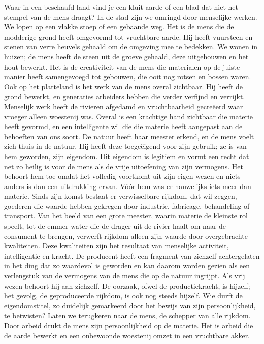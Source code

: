 \documentclass[
  a5paper,
  smalldemyvopaper,10pt,twoside,onecolumn,openright,extrafontsizes,hidelinks]{memoir}
\begin{document}
Waar in een beschaafd land vind je een kluit aarde of een blad dat niet
het stempel van de mens draagt? In de stad zijn we omringd door
menselijke werken. We lopen op een vlakke stoep of een gebaande weg. Het
is de mens die de modderige grond heeft omgevormd tot vruchtbare aarde.
Hij heeft vuursteen en stenen van verre heuvels gehaald om de omgeving
mee te bedekken. We wonen in huizen; de mens heeft de steen uit de
groeve gehaald, deze uitgehouwen en het hout bewerkt. Het is de
creativiteit van de mens die materialen op de juiste manier heeft
samengevoegd tot gebouwen, die ooit nog rotsen en bossen waren. Ook op
het platteland is het werk van de mens overal zichtbaar. Hij heeft de
grond bewerkt, en generaties arbeiders hebben die verder verfijnd en
verrijkt. Menselijk werk heeft de rivieren afgedamd en vruchtbaarheid
gecreëerd waar vroeger alleen woestenij was. Overal is een krachtige
hand zichtbaar die materie heeft gevormd, en een intelligente wil die
die materie heeft aangepast aan de behoeften van ons soort. De natuur
heeft haar meester erkend, en de mens voelt zich thuis in de natuur. Hij
heeft deze toegeëigend voor zijn gebruik; ze is van hem geworden, zijn
eigendom. Dit eigendom is legitiem en vormt een recht dat net zo heilig
is voor de mens als de vrije uitoefening van zijn vermogens. Het behoort
hem toe omdat het volledig voortkomt uit zijn eigen wezen en niets
anders is dan een uitdrukking ervan. Vóór hem was er nauwelijks iets
meer dan materie. Sinds zijn komst bestaat er verwisselbare rijkdom, dat
wil zeggen, goederen die waarde hebben gekregen door industrie,
fabricage, behandeling of transport. Van het beeld van een grote
meester, waarin materie de kleinste rol speelt, tot de emmer water die
de drager uit de rivier haalt om naar de consument te brengen, verwerft
rijkdom alleen zijn waarde door overgebrachte kwaliteiten. Deze
kwaliteiten zijn het resultaat van menselijke activiteit, intelligentie
en kracht. De producent heeft een fragment van zichzelf achtergelaten in
het ding dat zo waardevol is geworden en kan daarom worden gezien als
een verlengstuk van de vermogens van de mens die op de natuur ingrijpt.
Als vrij wezen behoort hij aan zichzelf. De oorzaak, ofwel de
productiekracht, is hijzelf; het gevolg, de geproduceerde rijkdom, is
ook nog steeds hijzelf. Wie durft de eigendomstitel, zo duidelijk
gemarkeerd door het bewijs van zijn persoonlijkheid, te betwisten? Laten
we terugkeren naar de mens, de schepper van alle rijkdom. Door arbeid
drukt de mens zijn persoonlijkheid op de materie. Het is arbeid die de
aarde bewerkt en een onbewoonde woestenij omzet in een vruchtbare akker.
\end{document}

